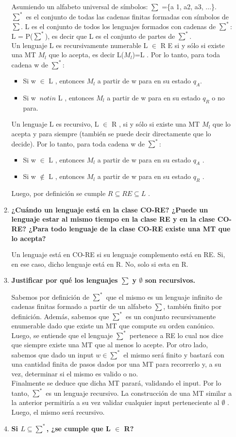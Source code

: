 \documentclass{article}
\begin{document}
\begin{enumerate}
\begin{enumerate}
Asumiendo un alfabeto universal de símbolos: $\sum$ =\{a 1, a2, a3, ...\}.\\
$\sum^*$ es el conjunto de todas las cadenas finitas formadas con símbolos de $\sum$. L es el 
conjunto de todos los lenguajes formados con cadenas de $\sum^*$: L = P($\sum^*$), es decir
que L es el conjunto de partes de $\sum^*$.\\
Un lenguaje L es recursivamente numerable L $\in$ R E si y sólo si existe una MT $M_l$
que lo acepta, es decir L($M_l$)=L . Por lo tanto, para toda cadena w de $\sum^*$:
\begin{itemize}
\item  Si w $\in$ L , entonces $M_l$ a partir de w para en su estado $q_A$.
\item  Si w $~notin$ L , entonces $M_l$ a partir de w para en su estado $q_R$ o no para.
\end{itemize}
Un lenguaje L es recursivo, L $\in$ R , si y sólo si existe una MT $M_l$ que lo acepta y para
siempre (también se puede decir directamente que lo decide). Por lo tanto, para toda
cadena w de $\sum^*$:
\begin{itemize}
\item Si w $\in$ L , entonces $M_l$ a partir de w para en su estado $q_A$ .
\item Si w $\notin$ L , entonces $M_l$ a partir de w para en su estado $q_R$ .
\end{itemize}
Luego, por definición se cumple $R\subseteq R E\subseteq L$ .


\item \textbf{¿Cuándo un lenguaje está en la clase CO-RE? ¿Puede un lenguaje estar al mismo tiempo en la clase RE y en la clase CO-RE? ¿Para todo lenguaje de la clase CO-RE existe una MT que lo acepta?}

Un lenguaje está en CO-RE si su lenguaje complemento está en RE. Si, en ese caso, dicho lenguaje
está en R. No, solo si esta en R.

\item \textbf{Justificar por qué los lenguajes $\sum$ y $\emptyset$ son recursivos.}

Sabemos por definición de $\sum^*$ que el mismo es un lenguaje infinito de cadenas finitas
formado a partir de un alfabeto $\sum$, también finito por definición. Además, sabemos que
$\sum^*$  es un conjunto recursivamente enumerable dado que existe un MT que compute su
orden canónico. Luego, se entiende que el lenguaje $\sum^*$ pertenece a RE lo cual nos dice
que siempre existe una MT que al menos lo acepte. Por otro lado, sabemos que dado
un input $w \in \sum^*$  el mismo será finito y bastará con una cantidad finita de pasos dados
por una MT para recorrerlo y, a su vez, determinar si el mismo es valido o no.\\
Finalmente se deduce que dicha MT parará, validando el input. Por lo tanto, $\sum^*$ es un
lenguaje recursivo. La construcción de una MT similar a la anterior permitiría a su vez
validar cualquier input perteneciente al $\emptyset$ . Luego, el mismo será recursivo.
\item \textbf{Si $L \subseteq \sum^*$, ¿se cumple que L $\in$ R?}


\end{enumerate}
\end{enumerate}
\end{document}
